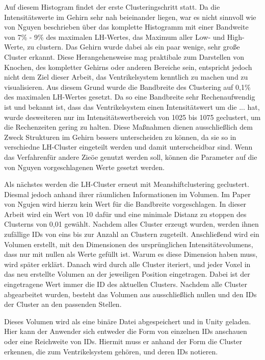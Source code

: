 Auf diesem Histogram findet der erste Clusteringschritt  statt.
Da die Intensitätswerte im Gehirn sehr nah beieinander liegen, war es nicht sinnvoll wie von Nguyen beschrieben über das komplette Histogramm mit einer Bandweite von 7\% - 9\% des maximalen LH-Wertes, das Maximum aller Low- und High-Werte, zu clustern. Das Gehirn wurde dabei als ein paar wenige, sehr große Cluster erkannt. Diese Herangehensweise mag praktibale zum Darstellen von Knochen, des kompletter Gehirns oder anderen Bereiche sein, entspricht jedoch nicht dem Ziel dieser Arbeit, das Ventrikelsystem kenntlich zu machen und zu visualisieren. Aus diesem Grund wurde die Bandbreite des Clustering auf 0,1\% des maximalen LH-Wertes gesetzt. Da so eine Bandbreite sehr Rechenaufwendig ist und bekannt ist, dass das Ventrikelsystem einen Intensitätswert um die ... hat, wurde desweiteren nur im Intensitätswertbereich von 1025 bis 1075 geclustert, um die Rechenzeiten gering zu halten. Diese Maßnahmen dienen ausschließlich dem Zweck Strukturen im Gehirn bessers unterscheiden zu können, da sie so in verschiedne LH-Cluster eingeteilt werden und damit unterscheidbar sind. Wenn das Verfahrenfür andere Zieöe genutzt werden soll, können die Parameter auf die von Nguyen vorgeschlagenen Werte gesetzt werden. 




Als nächstes werden die LH-Cluster erneut mit Meanshiftclustering geclustert. Diesmal jedoch anhand ihrer räumlichen Informationen im Volumen. Im Paper von Ngujen wird hierzu kein Wert für die Bandbreite vorgeschlagen. In dieser Arbeit wird ein Wert von 10 dafür und eine minimale Distanz zu stoppen des Clusterns von 0,01 gewählt.
Nachdem alles Cluster erzeugt wurden, werden ihnen zufällige IDs von eins bis zur Anzahl an Clustern zugeteilt. Anschließend wird ein Volumen erstellt, mit den Dimensionen des ursprünglichen Intensitätsvolumens, dass nur mit nullen als Werte gefüllt ist. Warum es diese Dimension haben muss, wird später erklärt. Danach wird durch alle Cluster iteriert, und jeder Voxel in das neu erstellte Volumen an der jeweiligen Position eingetragen. Dabei ist der eingetragene Wert immer die  ID des aktuellen Clusters. Nachdem alle Cluster abgearbeitet wurden, besteht das Volumen aus ausschließlich nullen und den IDs der Cluster an den passenden Stellen.


Dieses Volumen wird als eine binäre Datei abgespeichert und in Unity geladen. Hier kann der Anwender sich entweder die Form von einzelnen IDs anschauen oder eine Reichweite von IDs. Hiermit muss er anhand der Form die Cluster erkennen, die zum Ventrikelsystem gehören, und deren IDs notieren. 

